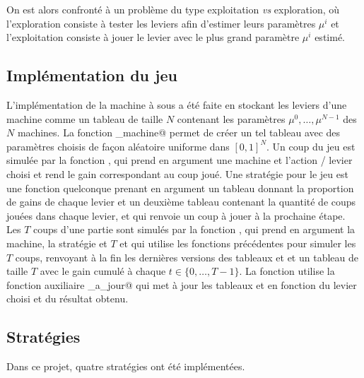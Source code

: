 \documentclass[a4paper,12pt]{article}
\begin{document}
On est alors confronté à un problème du type exploitation \emph{vs} exploration, où l'exploration consiste à tester les leviers afin d'estimer leurs paramètres $\mu^i$ et l'exploitation consiste à jouer le levier avec le plus grand paramètre $\mu^i$ estimé.

\subsection{Implémentation du jeu}
\label{SecImplementation}

L'implémentation de la machine à sous a été faite en stockant les leviers d'une machine comme un tableau de taille $N$ contenant les paramètres $\mu^0, \dots, \mu^{N-1}$ des $N$ machines. La fonction \verb@cree_machine@ permet de créer un tel tableau avec des paramètres choisis de façon aléatoire uniforme dans $[0, 1]^N$. Un coup du jeu est simulée par la fonction \verb@jouer@, qui prend en argument une machine et l'action / levier choisi et rend le gain correspondant au coup joué. Une stratégie pour le jeu est une fonction quelconque prenant en argument un tableau \verb@mu@ donnant la proportion de gains de chaque levier et un deuxième tableau \verb@Na@ contenant la quantité de coups jouées dans chaque levier, et qui renvoie un coup à jouer à la prochaine étape. Les $T$ coups d'une partie sont simulés par la fonction \verb@run@, qui prend en argument la machine, la stratégie et $T$ et qui utilise les fonctions précédentes pour simuler les $T$ coups, renvoyant à la fin les dernières versions des tableaux \verb@mu@ et \verb@Na@ et un tableau de taille $T$ avec le gain cumulé à chaque $t \in \{0, \dotsc, T-1\}$. La fonction \verb@run@ utilise la fonction auxiliaire \verb@mise_a_jour@ qui met à jour les tableaux \verb@mu@ et \verb@Na@ en fonction du levier choisi et du résultat obtenu.

\subsection{Stratégies}

Dans ce projet, quatre stratégies ont été implémentées.
\end{document}
